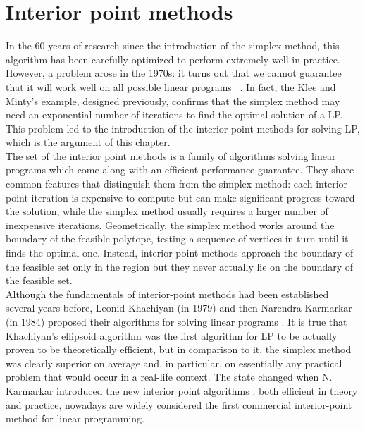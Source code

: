 \documentclass[a4paper,10 pt,titlepage,twoside]{book}
\theoremstyle{plain}
\theoremstyle{definition}
\theoremstyle{remark}
\begin{document}
\chapter{Interior point methods}
In the 60 years of research since the introduction of the simplex method, this algorithm has been carefully optimized to perform extremely well in practice. However, a problem arose in the 1970s: it turns out that we cannot guarantee that it will work well on all possible linear programs ~\cite{MINTY}.
In fact, the Klee and Minty's example, designed previously, confirms that the simplex method may need an exponential number of iterations to find the optimal solution of a LP. \\
This problem led to the introduction of the interior point methods for solving LP, which is the argument of this chapter.\\
The set of the interior point methods is a family of algorithms solving linear programs which come along with an efficient performance guarantee. They share common features that distinguish them from the simplex method: each interior point iteration is expensive to compute but can make significant progress toward the solution, while the simplex method usually requires a larger number of inexpensive iterations. Geometrically, the simplex method works around the boundary of the feasible polytope, testing a sequence of vertices in turn until it finds the optimal one. Instead, interior point methods approach the boundary of the feasible set only in the region but they never actually lie on the boundary of the feasible set.\\
Although the fundamentals of interior-point methods had been established several years
before, Leonid Khachiyan (in 1979) and then Narendra Karmarkar (in 1984) proposed their algorithms for solving linear programs \cite{WWW}. It is true that Khachiyan’s ellipsoid algorithm was the first algorithm for LP to be actually proven to
be theoretically efficient, but in comparison to it, the simplex method was clearly superior on average and, in particular, on essentially any practical
problem that would occur in a real-life context. The state changed when N. Karmarkar introduced the new interior point algorithms \cite{Kar}; both efficient in theory and practice, nowadays are widely considered the first commercial interior-point
method for linear programming.\\
\end{document}

